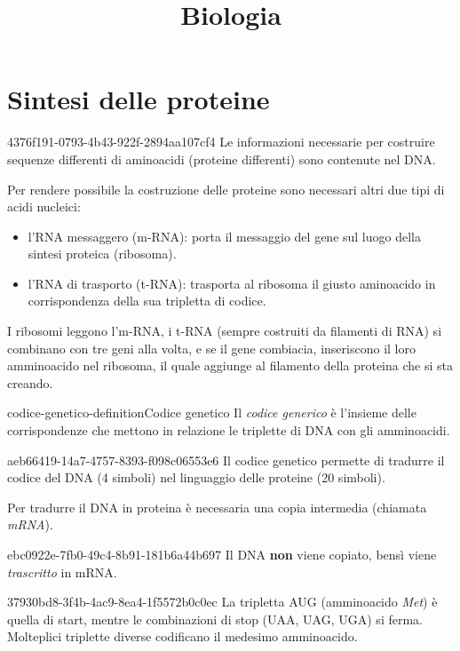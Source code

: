 \documentclass[preview]{standalone}
\begin{document}
\title{Biologia}
\genpage

\section{Sintesi delle proteine}

\begin{snippet}{4376f191-0793-4b43-922f-2894aa107cf4}
    Le informazioni necessarie per costruire sequenze
    differenti di aminoacidi (proteine differenti) sono
    contenute nel DNA.
    
    Per rendere possibile la costruzione delle proteine sono
    necessari altri due tipi di acidi nucleici:
    
    \begin{itemize}
        \item l'RNA messaggero (m-RNA): porta il messaggio del
            gene sul luogo della sintesi proteica (ribosoma).
        \item l'RNA di trasporto (t-RNA): trasporta al ribosoma il
            giusto aminoacido in corrispondenza della sua
            tripletta di codice.
    \end{itemize}
    
    I ribosomi leggono l'm-RNA, i t-RNA (sempre costruiti da filamenti di RNA)
    si combinano con tre geni alla volta, e se il gene
    combiacia, inseriscono il loro amminoacido nel ribosoma, il quale
    aggiunge al filamento della proteina che si sta creando.
\end{snippet}


\begin{snippetdefinition}{codice-genetico-definition}{Codice genetico}
    Il \textit{codice generico} è l'insieme
    delle corrispondenze che mettono in
    relazione le triplette di DNA con gli amminoacidi.
\end{snippetdefinition}

\begin{snippet}{aeb66419-14a7-4757-8393-f098c06553e6}
    Il codice genetico permette di tradurre il codice del DNA
    (4 simboli) nel linguaggio delle proteine (20 simboli).


    Per tradurre il DNA in proteina è necessaria una copia intermedia
    (chiamata \textit{mRNA}).
\end{snippet}

\begin{snippetnote}{ebc0922e-7fb0-49c4-8b91-181b6a44b697}{}
    Il DNA \textbf{non} viene copiato, bensì viene
    \textit{trascritto} in mRNA.
\end{snippetnote}

\begin{snippet}{37930bd8-3f4b-4ac9-8ea4-1f5572b0c0ec}
    La tripletta AUG (amminoacido \textit{Met}) è quella di start,
    mentre le combinazioni di stop (UAA, UAG, UGA) si ferma.
    Molteplici triplette diverse codificano il medesimo amminoacido.
\end{snippet}
\end{document}
